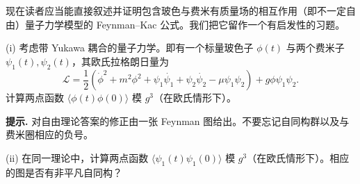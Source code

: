 现在读者应当能直接叙述并证明包含玻色与费米有质量场的相互作用（即不一定自由）量子力学模型的 Feynman–Kac 公式。我们把它留作一个有启发性的习题。

\begin{exercise} (i) 考虑带 Yukawa 耦合的量子力学。即有一个标量玻色子 $\phi(t)$ 与两个费米子 $\psi_1(t),\psi_2(t)$，其欧氏拉格朗日量为
$$
{\mathcal L}=\frac{1}{2}(\dot{\phi}^2+m^2\phi^2+
\psi_1\dot{\psi_1}+\psi_2\dot{\psi_2}-\mu \psi_1\psi_2)+
g\phi\psi_1\psi_2.
$$
计算两点函数 $\langle\phi(t)\phi(0)\rangle$ 模 $g^3$（在欧氏情形下）。

\textbf{提示.} 对自由理论答案的修正由一张 Feynman 图给出。不要忘记自同构群以及与费米圈相应的负号。

(ii) 在同一理论中，计算两点函数 $\langle\psi_1(t)\psi_1(0)\rangle$ 模 $g^3$（在欧氏情形下）。相应的图是否有非平凡自同构？
\end{exercise}
